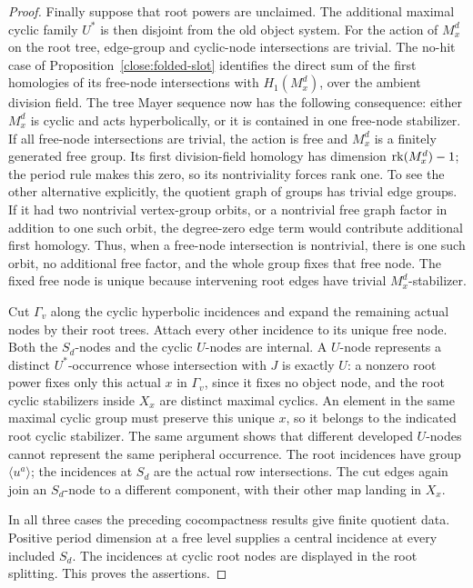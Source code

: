 \begin{proof}
Finally suppose that root powers are unclaimed.  The additional
maximal cyclic family $U^*$ is then disjoint from the old object system.
For the action of $M_x^d$ on the root tree, edge-group and cyclic-node
intersections are trivial. The no-hit case of
Proposition~\ref{close:folded-slot} identifies the direct sum of the
first homologies of its free-node intersections with $H_1(M_x^d)$,
over the ambient division field. The tree Mayer sequence now has the
following consequence: either $M_x^d$ is cyclic and acts hyperbolically,
or it is contained in one free-node stabilizer.  If all free-node
intersections are trivial, the action is free and $M_x^d$ is a
finitely generated free group.  Its first division-field homology
has dimension $\operatorname{rk}(M_x^d)-1$; the period rule makes this zero, so its
nontriviality forces rank one.  To see the other alternative explicitly, the quotient graph of groups has trivial edge
groups.  If it had two nontrivial vertex-group orbits, or a nontrivial
free graph factor in addition to one such orbit, the degree-zero edge
term would contribute additional first homology.  Thus, when a
free-node intersection is nontrivial, there is one such orbit, no
additional free factor, and the whole group fixes that free node.  The
fixed free node is unique because intervening root edges have trivial
$M_x^d$-stabilizer.

Cut $\Gamma_v$ along the cyclic hyperbolic incidences and expand the
remaining actual nodes by their root trees.  Attach every other
incidence to its unique free node.  Both the $S_d$-nodes and the cyclic
$U$-nodes are internal.  A $U$-node represents a distinct $U^*$-occurrence
whose intersection with $J$ is exactly $U$: a nonzero root power fixes
only this actual $x$ in $\Gamma_v$, since it fixes no object node, and
the root cyclic stabilizers inside $X_x$ are distinct maximal cyclics.
An element in the same maximal cyclic group must preserve this unique
$x$, so it belongs to the indicated root cyclic stabilizer.  The same
argument shows that different developed $U$-nodes cannot represent the
same peripheral occurrence.  The root incidences have group
$\langle u^a\rangle$; the incidences at $S_d$ are the actual row
intersections.  The cut edges again join an $S_d$-node to a different
component, with their other map landing in $X_x$.

In all three cases the preceding cocompactness results give finite
quotient data.  Positive period dimension at a free level supplies a
central incidence at every included $S_d$.  The incidences at cyclic
root nodes are displayed in the root splitting.  This proves the
assertions.
\end{proof}

